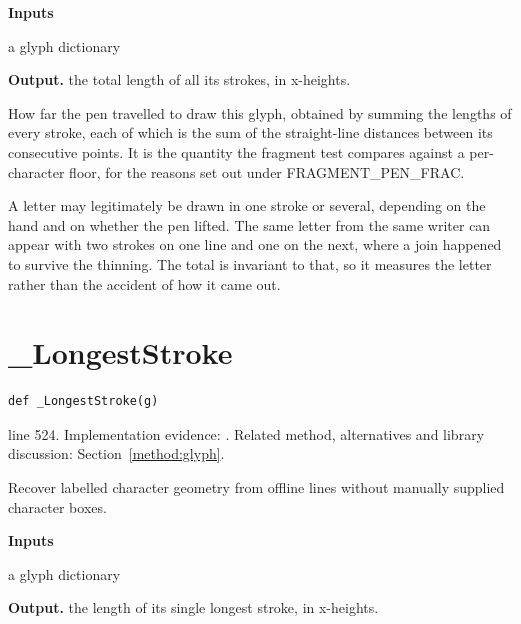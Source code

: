 \noindent\textbf{Inputs}
\begin{description}[leftmargin=2.2em,style=nextline,font=\normalfont\ttfamily]\setlength\itemsep{1pt}
  \item[{g}] \normalfont a glyph dictionary
\end{description}

\noindent\textbf{Output.} the total length of all its strokes, in x-heights.


How far the pen travelled to draw this glyph, obtained by summing the lengths of every stroke, each of which is the sum of the straight-line distances between its consecutive points. It is the quantity the fragment test compares against a per-character floor, for the reasons set out under FRAGMENT\_PEN\_FRAC.


A letter may legitimately be drawn in one stroke or several, depending on the hand and on whether the pen lifted. The same letter from the same writer can appear with two strokes on one line and one on the next, where a join happened to survive the thinning. The total is invariant to that, so it measures the letter rather than the accident of how it came out.



\section{\_LongestStroke}\label{fn:style:-LongestStroke}
\begin{lstlisting}[style=sig]
def _LongestStroke(g)
\end{lstlisting}
 line 524. Implementation evidence: \cite{code2026}. Related method, alternatives and library discussion: Section~\ref{method:glyph}.


Recover labelled character geometry from offline lines without manually supplied character boxes.




\noindent\textbf{Inputs}
\begin{description}[leftmargin=2.2em,style=nextline,font=\normalfont\ttfamily]\setlength\itemsep{1pt}
  \item[{g}] \normalfont a glyph dictionary
\end{description}

\noindent\textbf{Output.} the length of its single longest stroke, in x-heights.


